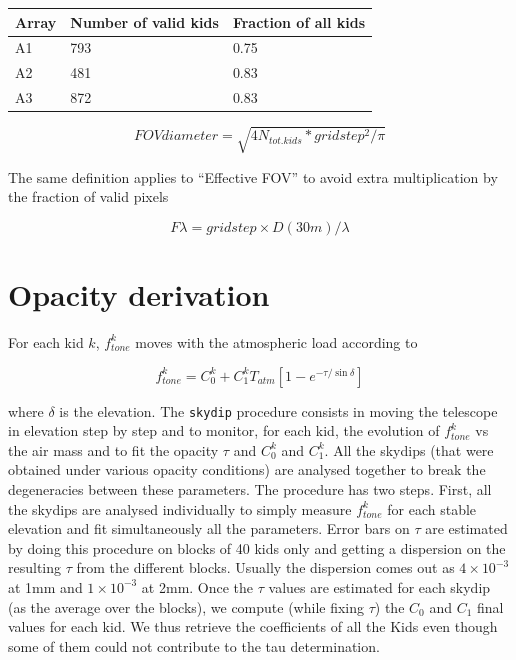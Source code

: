 \documentclass[a4paper, 11pt]{article} %
\begin{document}
\begin{table}
\begin{tabular}{|l|l|l|}
\hline
Array & Number of valid kids & Fraction of all kids\\
\hline
A1 & 793 & 0.75\\
A2 & 481 & 0.83\\
A3 & 872 & 0.83\\
\hline
\end{tabular}
\end{table}

\begin{equation}
FOV diameter = \sqrt{4 N_{tot. kids} * gridstep^2/\pi}
\end{equation}

The same definition applies to ``Effective FOV'' to avoid extra multiplication
by the fraction of valid pixels

\begin{equation}
F\lambda = gridstep\times D(30m)/\lambda
\end{equation}

\section{Opacity derivation}
\label{se:opacities}

For each kid $k$, $f_{tone}^k$ moves with the atmospheric load according to

\begin{equation}
f_{tone}^k = C_0^k + C_1^k T_{atm}[1-e^{-\tau/\sin\delta}]
\end{equation}

where $\delta$ is the elevation. The {\tt skydip} procedure consists in moving
the telescope in elevation step by step and to monitor, for each kid, the
evolution of $f_{tone}^k$ vs the air mass and to fit the opacity $\tau$ and
$C_0^k$ and $C_1^k$. All the skydips (that were obtained under various opacity
conditions) are analysed together to break the degeneracies between these
parameters. The procedure has two steps. First, all the skydips are analysed
individually to simply measure $f_{tone}^k$ for each stable elevation and fit
simultaneously all the parameters. Error bars on $\tau$ are estimated by doing
this procedure on blocks of 40 kids only and getting a dispersion on the
resulting $\tau$ from the different blocks. Usually the dispersion comes out as
$4\times 10^{-3}$ at 1mm and $1\times 10^{-3}$ at 2mm. Once the $\tau$ values
are estimated for each skydip (as the average over the blocks), we compute
(while fixing $\tau$) the $C_0$ and $C_1$ final values for each kid. We thus
retrieve the coefficients of all the Kids even though some of them could not
contribute to the tau determination.
\end{document}
